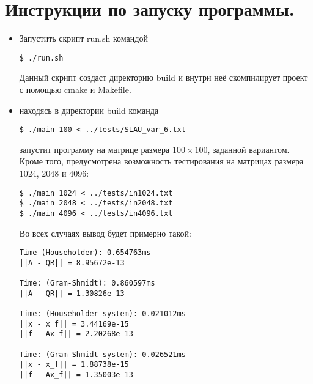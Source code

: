 \documentclass[a4paper,12pt,titlepage,final]{article}
\begin{document}
\section{Инструкции по запуску программы.}
\begin{itemize}
    \item Запустить скрипт run.sh командой 
\begin{lstlisting}
$ ./run.sh 
\end{lstlisting} 
Данный скрипт создаст директорию build и внутри неё скомпилирует проект с помощью cmake и Makefile. 
    \item находясь в директории build команда 
\begin{lstlisting}
$ ./main 100 < ../tests/SLAU_var_6.txt
\end{lstlisting} 
    запустит программу на матрице размера $100 \times 100$, заданной вариантом. Кроме того, предусмотрена возможность тестирования на матрицах размера 1024, 2048 и 4096:
\begin{lstlisting}
$ ./main 1024 < ../tests/in1024.txt
$ ./main 2048 < ../tests/in2048.txt
$ ./main 4096 < ../tests/in4096.txt
\end{lstlisting} 
Во всех случаях вывод будет примерно такой:
\begin{lstlisting}
Time (Householder): 0.654763ms
||A - QR|| = 8.95672e-13

Time: (Gram-Shmidt): 0.860597ms
||A - QR|| = 1.30826e-13

Time: (Householder system): 0.021012ms
||x - x_f|| = 3.44169e-15
||f - Ax_f|| = 2.20268e-13

Time: (Gram-Shmidt system): 0.026521ms
||x - x_f|| = 1.88738e-15
||f - Ax_f|| = 1.35003e-13
\end{lstlisting} 
\end{itemize}
\end{document}
